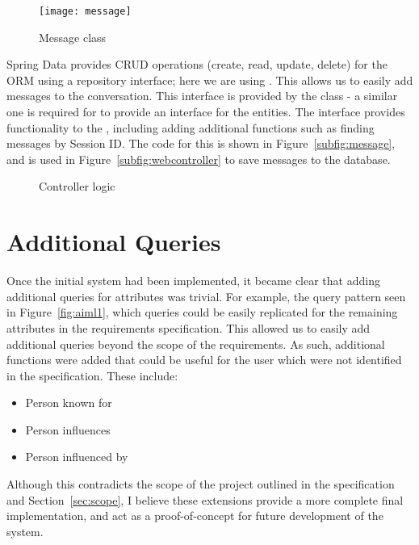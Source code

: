 \begin{figure}[h]
	\centering
	\texttt{[image: message]}
	\caption{Message class}
	\label{fig:message}
\end{figure}


Spring Data provides CRUD operations (create, read, update, delete) for the ORM using a repository interface; here we are using . This allows us to easily add messages to the conversation. This interface is provided by the  class - a similar one is required for  to provide an interface for the  entities. The  interface provides functionality to the , including adding additional functions such as finding messages by Session ID. The code for this is shown in Figure~\ref{subfig:message}, and is used in Figure~\ref{subfig:webcontroller} to save messages to the database.

\begin{figure}[h]
	\centering
	\qquad
	\caption{Controller logic}
	\label{fig:controller}
\end{figure}

\newpage
\section{Additional Queries}
Once the initial system had been implemented, it became clear that adding additional queries for attributes was trivial. For example, the query pattern seen in Figure~\ref{fig:aiml1}, which queries  could be easily replicated for the remaining attributes in the requirements specification. This allowed us to easily add additional queries beyond the scope of the requirements. As such, additional functions were added that could be useful for the user which were not identified in the specification. These include:
\begin{itemize}
	\item Person known for
	\item Person influences
	\item Person influenced by
\end{itemize}
Although this contradicts the scope of the project outlined in the specification and Section~\ref{sec:scope}, I believe these extensions provide a more complete final implementation, and act as a proof-of-concept for future development of the system.


